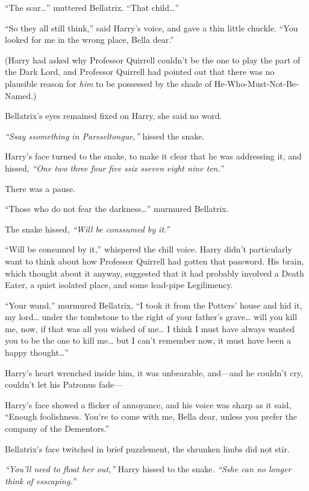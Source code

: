 ``The scar\ldots{}'' muttered Bellatrix. ``That child\ldots{}''

``So they all still think,'' said Harry's voice, and gave a thin little
chuckle. ``You looked for me in the wrong place, Bella dear.''

(Harry had asked why Professor Quirrell couldn't be the one to play the
part of the Dark Lord, and Professor Quirrell had pointed out that there
was no plausible reason for \emph{him} to be possessed by the shade of
He-Who-Must-Not-Be-Named.)

Bellatrix's eyes remained fixed on Harry, she said no word.

\emph{``Ssay ssomething in Parsseltongue,''} hissed the snake.

Harry's face turned to the snake, to make it clear that he was
addressing it, and hissed, \emph{``One two three four five ssix sseven
eight nine ten.''}

There was a pause.

``Those who do not fear the darkness\ldots{}'' murmured Bellatrix.

The snake hissed, \emph{``Will be conssumed by it.''}

``Will be consumed by it,'' whispered the chill voice. Harry didn't
particularly want to think about how Professor Quirrell had gotten that
password. His brain, which thought about it anyway, suggested that it
had probably involved a Death Eater, a quiet isolated place, and some
lead-pipe Legilimency.

``Your wand,'' murmured Bellatrix, ``I took it from the Potters' house
and hid it, my lord\ldots{} under the tombstone to the right of your
father's grave\ldots{} will you kill me, now, if that was all you wished
of me\ldots{} I think I must have always wanted you to be the one to
kill me\ldots{} but I can't remember now, it must have been a happy
thought\ldots{}''

Harry's heart wrenched inside him, it was unbearable, and---and he
couldn't cry, couldn't let his Patronus fade---

Harry's face showed a flicker of annoyance, and his voice was sharp as
it said, ``Enough foolishness. You're to come with me, Bella dear,
unless you prefer the company of the Dementors.''

Bellatrix's face twitched in brief puzzlement, the shrunken limbs did
not stir.

\emph{``You'll need to float her out,''} Harry hissed to the snake.
\emph{``Sshe can no longer think of esscaping.''}

